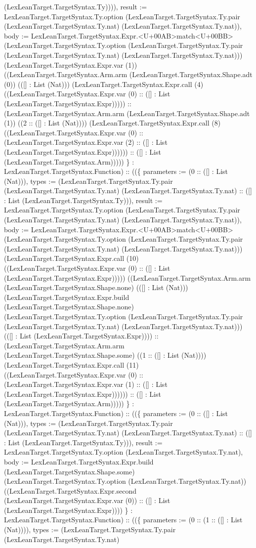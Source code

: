 \documentclass[11pt]{article}
\begin{document}
(LexLeanTarget.TargetSyntax.Ty)))), result := LexLeanTarget.TargetSyntax.Ty.option (LexLeanTarget.TargetSyntax.Ty.pair (LexLeanTarget.TargetSyntax.Ty.nat) (LexLeanTarget.TargetSyntax.Ty.nat)), body := LexLeanTarget.TargetSyntax.Expr.<U+00AB>match<U+00BB> (LexLeanTarget.TargetSyntax.Ty.option (LexLeanTarget.TargetSyntax.Ty.pair (LexLeanTarget.TargetSyntax.Ty.nat) (LexLeanTarget.TargetSyntax.Ty.nat))) (LexLeanTarget.TargetSyntax.Expr.var (1)) ((LexLeanTarget.TargetSyntax.Arm.arm (LexLeanTarget.TargetSyntax.Shape.adt (0)) (([] : List (Nat))) (LexLeanTarget.TargetSyntax.Expr.call (4) ((LexLeanTarget.TargetSyntax.Expr.var (0) :: ([] : List (LexLeanTarget.TargetSyntax.Expr))))) :: (LexLeanTarget.TargetSyntax.Arm.arm (LexLeanTarget.TargetSyntax.Shape.adt (1)) ((2 :: ([] : List (Nat)))) (LexLeanTarget.TargetSyntax.Expr.call (8) ((LexLeanTarget.TargetSyntax.Expr.var (0) :: (LexLeanTarget.TargetSyntax.Expr.var (2) :: ([] : List (LexLeanTarget.TargetSyntax.Expr)))))) :: ([] : List (LexLeanTarget.TargetSyntax.Arm))))) \} : LexLeanTarget.TargetSyntax.Function) :: ((\{ parameters := (0 :: ([] : List (Nat))), types := (LexLeanTarget.TargetSyntax.Ty.pair (LexLeanTarget.TargetSyntax.Ty.nat) (LexLeanTarget.TargetSyntax.Ty.nat) :: ([] : List (LexLeanTarget.TargetSyntax.Ty))), result := LexLeanTarget.TargetSyntax.Ty.option (LexLeanTarget.TargetSyntax.Ty.pair (LexLeanTarget.TargetSyntax.Ty.nat) (LexLeanTarget.TargetSyntax.Ty.nat)), body := LexLeanTarget.TargetSyntax.Expr.<U+00AB>match<U+00BB> (LexLeanTarget.TargetSyntax.Ty.option (LexLeanTarget.TargetSyntax.Ty.pair (LexLeanTarget.TargetSyntax.Ty.nat) (LexLeanTarget.TargetSyntax.Ty.nat))) (LexLeanTarget.TargetSyntax.Expr.call (10) ((LexLeanTarget.TargetSyntax.Expr.var (0) :: ([] : List (LexLeanTarget.TargetSyntax.Expr))))) ((LexLeanTarget.TargetSyntax.Arm.arm (LexLeanTarget.TargetSyntax.Shape.none) (([] : List (Nat))) (LexLeanTarget.TargetSyntax.Expr.build (LexLeanTarget.TargetSyntax.Shape.none) (LexLeanTarget.TargetSyntax.Ty.option (LexLeanTarget.TargetSyntax.Ty.pair (LexLeanTarget.TargetSyntax.Ty.nat) (LexLeanTarget.TargetSyntax.Ty.nat))) (([] : List (LexLeanTarget.TargetSyntax.Expr)))) :: (LexLeanTarget.TargetSyntax.Arm.arm (LexLeanTarget.TargetSyntax.Shape.some) ((1 :: ([] : List (Nat)))) (LexLeanTarget.TargetSyntax.Expr.call (11) ((LexLeanTarget.TargetSyntax.Expr.var (0) :: (LexLeanTarget.TargetSyntax.Expr.var (1) :: ([] : List (LexLeanTarget.TargetSyntax.Expr)))))) :: ([] : List (LexLeanTarget.TargetSyntax.Arm))))) \} : LexLeanTarget.TargetSyntax.Function) :: ((\{ parameters := (0 :: ([] : List (Nat))), types := (LexLeanTarget.TargetSyntax.Ty.pair (LexLeanTarget.TargetSyntax.Ty.nat) (LexLeanTarget.TargetSyntax.Ty.nat) :: ([] : List (LexLeanTarget.TargetSyntax.Ty))), result := LexLeanTarget.TargetSyntax.Ty.option (LexLeanTarget.TargetSyntax.Ty.nat), body := LexLeanTarget.TargetSyntax.Expr.build (LexLeanTarget.TargetSyntax.Shape.some) (LexLeanTarget.TargetSyntax.Ty.option (LexLeanTarget.TargetSyntax.Ty.nat)) ((LexLeanTarget.TargetSyntax.Expr.second (LexLeanTarget.TargetSyntax.Expr.var (0)) :: ([] : List (LexLeanTarget.TargetSyntax.Expr)))) \} : LexLeanTarget.TargetSyntax.Function) :: ((\{ parameters := (0 :: (1 :: ([] : List (Nat)))), types := (LexLeanTarget.TargetSyntax.Ty.pair (LexLeanTarget.TargetSyntax.Ty.nat) 
\end{document}
